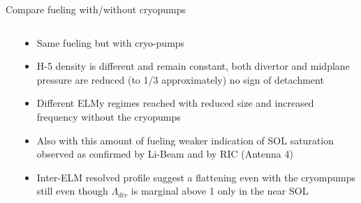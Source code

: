 \documentclass[10pt, compress]{beamer}
\newcommand\Fontvi{\fontsize{8}{7.2}\selectfont}
\begin{document}
\begin{frame}{Compare fueling with/without cryopumps}
\Fontvi
  \vspace{-1cm}
\begin{columns}
  \begin{column}{0.65\textwidth}
  \end{column}
  \begin{column}{0.35\textwidth}
    \begin{itemize}
    \item<1-> Same fueling but with cryo-pumps
      \item<1-> H-5 density is different and remain constant, both
        divertor and midplane pressure are reduced (to 1/3
        approximately) no sign of detachment
      \item<2-> Different ELMy regimes reached with reduced size and
        increased frequency without the cryopumps
      \item<3-> Also with this amount of fueling weaker indication of SOL
        saturation observed as confirmed by Li-Beam and by RIC (Antenna 4)
      \item<4> Inter-ELM resolved profile suggest a flattening even
        with the cryompumps still even though $\Lambda_{div}$ is
        marginal above 1 only in the near SOL
        
    \end{itemize}
  \end{column}
\end{columns}
\end{frame}
\end{document}
